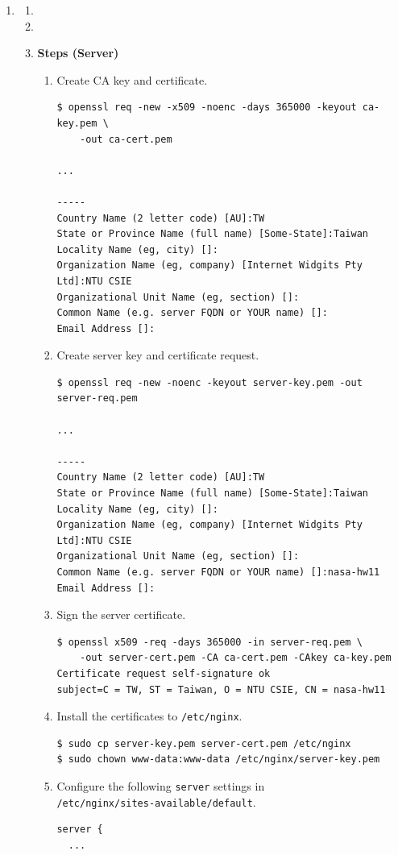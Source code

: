 \documentclass[12pt, a4paper]{article}
\begin{document}
\begin{enumerate}[resume]
    \item
    \begin{enumerate}
      \item

      \item

      \item \textbf{Steps (Server)}
      \begin{enumerate}[label=(\arabic*)]
        \item Create CA key and certificate.
        \begin{Verbatim}[frame=single, fontsize=\footnotesize]
$ openssl req -new -x509 -noenc -days 365000 -keyout ca-key.pem \
    -out ca-cert.pem

...

-----
Country Name (2 letter code) [AU]:TW
State or Province Name (full name) [Some-State]:Taiwan
Locality Name (eg, city) []:
Organization Name (eg, company) [Internet Widgits Pty Ltd]:NTU CSIE
Organizational Unit Name (eg, section) []:
Common Name (e.g. server FQDN or YOUR name) []:
Email Address []:
        \end{Verbatim}
        \item Create server key and certificate request.
        \begin{Verbatim}[frame=single, fontsize=\footnotesize]
$ openssl req -new -noenc -keyout server-key.pem -out server-req.pem

...

-----
Country Name (2 letter code) [AU]:TW
State or Province Name (full name) [Some-State]:Taiwan
Locality Name (eg, city) []:
Organization Name (eg, company) [Internet Widgits Pty Ltd]:NTU CSIE
Organizational Unit Name (eg, section) []:
Common Name (e.g. server FQDN or YOUR name) []:nasa-hw11
Email Address []:
        \end{Verbatim}
        \item Sign the server certificate.
        \begin{Verbatim}[frame=single]
$ openssl x509 -req -days 365000 -in server-req.pem \
    -out server-cert.pem -CA ca-cert.pem -CAkey ca-key.pem
Certificate request self-signature ok
subject=C = TW, ST = Taiwan, O = NTU CSIE, CN = nasa-hw11
        \end{Verbatim}

        \item Install the certificates to \verb|/etc/nginx|.
        \begin{Verbatim}[frame=single]
$ sudo cp server-key.pem server-cert.pem /etc/nginx
$ sudo chown www-data:www-data /etc/nginx/server-key.pem
        \end{Verbatim}
        \item Configure the following \verb|server| settings in\\
        \verb|/etc/nginx/sites-available/default|.
        \begin{Verbatim}[frame=single]
server {
  ...


\end{Verbatim}
\end{enumerate}
\end{enumerate}
\end{enumerate}
\end{document}

